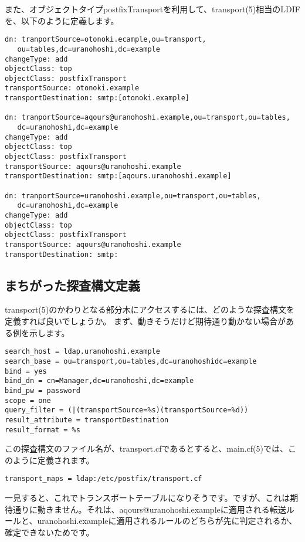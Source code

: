 また、オブジェクトタイプpostfixTransportを利用して、transport(5)相当のLDIFを、以下のように定義します。

\begin{verbatim}
dn: tranportSource=otonoki.ecample,ou=transport,
   ou=tables,dc=uranohoshi,dc=example
changeType: add
objectClass: top
objectClass: postfixTransport
transportSource: otonoki.example
transportDestination: smtp:[otonoki.example]

dn: tranportSource=aqours@uranohoshi.example,ou=transport,ou=tables,
   dc=uranohoshi,dc=example
changeType: add
objectClass: top
objectClass: postfixTransport
transportSource: aqours@uranohoshi.example
transportDestination: smtp:[aqours.uranohoshi.example]

dn: tranportSource=uranohoshi.example,ou=transport,ou=tables,
   dc=uranohoshi,dc=example
changeType: add
objectClass: top
objectClass: postfixTransport
transportSource: aqours@uranohoshi.example
transportDestination: smtp:

\end{verbatim}

\subsection{まちがった探査構文定義}

transport(5)のかわりとなる部分木にアクセスするには、どのような探査構文を定義すれば良いでしょうか。
まず、動きそうだけど期待通り動かない場合がある例を示します。

\begin{verbatim}
search_host = ldap.uranohoshi.example
search_base = ou=transport,ou=tables,dc=uranohoshidc=example
bind = yes
bind_dn = cn=Manager,dc=uranohoshi,dc=example
bind_pw = password
scope = one
query_filter = (|(transportSource=%s)(transportSource=%d))
result_attribute = transportDestination
result_format = %s
\end{verbatim}

この探査構文のファイル名が、transport.cfであるとすると、main.cf(5)では、このように定義されます。

\begin{verbatim}
transport_maps = ldap:/etc/postfix/transport.cf
\end{verbatim}

一見すると、これでトランスポートテーブルになりそうです。ですが、これは期待通りに動きません。それは、aqours@uranohoshi.exampleに適用される転送ルールと、uranohoshi.exampleに適用されるルールのどちらが先に判定されるか、確定できないためです。

